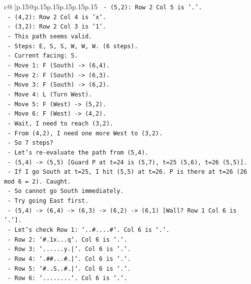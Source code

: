 \documentclass{article}
\begin{document}
{\begin{supertabular}{c@{$\;$}|p{.15\linewidth}@{}p{.15\linewidth}p{.15\linewidth}p{.15\linewidth}p{.15\linewidth}p{.15\linewidth}}
{{{\texttt{       {-} (5,2): Row 2 Col 5 is '.'.} \\
\texttt{       {-} (4,2): Row 2 Col 4 is 'x'.} \\
\texttt{       {-} (3,2): Row 2 Col 3 is '1'.} \\
\texttt{       {-} This path seems valid.} \\
\texttt{       {-} Steps: E, S, S, W, W, W. (6 steps).} \\
\texttt{       {-} Current facing: S.} \\
\texttt{       {-} Move 1: F (South) {-}> (6,4).} \\
\texttt{       {-} Move 2: F (South) {-}> (6,3).} \\
\texttt{       {-} Move 3: F (South) {-}> (6,2).} \\
\texttt{       {-} Move 4: L (Turn West).} \\
\texttt{       {-} Move 5: F (West) {-}> (5,2).} \\
\texttt{       {-} Move 6: F (West) {-}> (4,2).} \\
\texttt{       {-} Wait, I need to reach (3,2).} \\
\texttt{       {-} From (4,2), I need one more West to (3,2).} \\
\texttt{       {-} So 7 steps?} \\
\texttt{       {-} Let's re{-}evaluate the path from (5,4).} \\
\texttt{       {-} (5,4) {-}> (5,5) {[}Guard P at t=24 is (5,7), t=25 (5,6), t=26 (5,5){]}.} \\
\texttt{         {-} If I go South at t=25, I hit (5,5) at t=26. P is there at t=26 (26 mod 6 = 2). Caught.} \\
\texttt{         {-} So cannot go South immediately.} \\
\texttt{       {-} Try going East first.} \\
\texttt{       {-} (5,4) {-}> (6,4) {-}> (6,3) {-}> (6,2) {-}> (6,1) {[}Wall? Row 1 Col 6 is '.'{]}.} \\
\texttt{       {-} Let's check Row 1: `..\#....\#`. Col 6 is `.`.} \\
\texttt{       {-} Row 2: `\#.1x...q`. Col 6 is `.`.} \\
\texttt{       {-} Row 3: `......y.|`. Col 6 is `.`.} \\
\texttt{       {-} Row 4: `.\#\#...\#.|`. Col 6 is `.`.} \\
\texttt{       {-} Row 5: `\#..S..\#.|`. Col 6 is `.`.} \\
\texttt{       {-} Row 6: `........`. Col 6 is `.`.} \\
}}}
\end{supertabular}}
\end{document}
